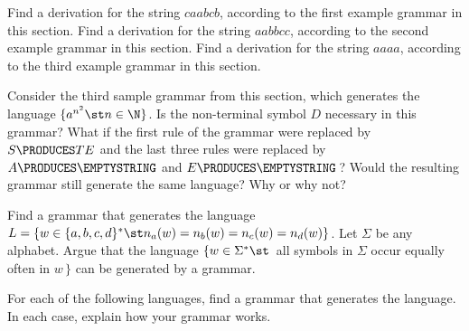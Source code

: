 \begin{exercises}

\problem Find a derivation for the string $caabcb$, according to the first example
grammar in this section.
Find a derivation for the string $aabbcc$, according to the second example
grammar in this section.
Find a derivation for the string $aaaa$, according to the third example
grammar in this section.

\problem Consider the third sample grammar from this section, which generates
the language $\{a^{n^2}\st n\in\N\}$.  Is the non-terminal symbol $D$ necessary
in this grammar?  What if the first rule of the grammar were replaced by
$S\PRODUCES TE$ and the last three rules were replaced by $A\PRODUCES\EMPTYSTRING$
and $E\PRODUCES\EMPTYSTRING\,$?  Would the resulting grammar still generate
the same language?  Why or why not?

\problem Find a grammar that generates the language $L=\{w\in\{a,b,c,d\}^*\st
n_a(w)=n_b(w)=n_c(w)=n_d(w)\}$.  Let $\Sigma$ be any alphabet.
Argue that the language $\{w\in\Sigma^*\st\,$ all symbols in $\Sigma$ occur equally
often in $w\,\}$ can be generated by a grammar.

\problem For each of the following languages, find a grammar that generates
the language.  In each case, explain how your grammar works.


\end{exercises}





